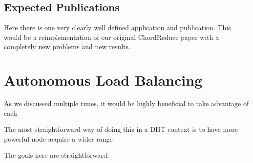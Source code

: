 \subsection{Expected Publications}
Here there is one very clearly well defined application and publication.
This would be a reimplementation of our original ChordReduce paper with a completely new problems and new results.


\section{Autonomous Load Balancing}

As we discussed multiple times, it would be highly beneficial to take advantage of each 

The most straightforward way of doing this in a DHT context is to have more powerful node acquire a wider range

The goals here are straightforward:

